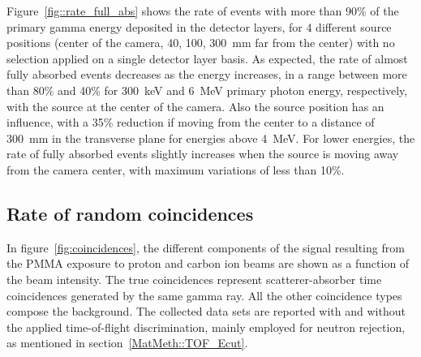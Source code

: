 Figure~\ref{fig::rate_full_abs} shows the rate of events with more than 90\% of the primary gamma energy deposited in the detector layers, for 4 different source positions (center of the camera, 40, 100, 300~mm far from the center) with no selection applied on a single detector layer basis. As expected, the rate of almost fully absorbed events decreases as the energy increases, in a range between more than 80\% and 40\% for 300~keV and 6~MeV primary photon energy, respectively, with the source at the center of the camera. Also the source position has an influence, with a 35\% reduction if moving from the center to a distance of 300~mm in the transverse plane for energies above 4~MeV. For lower energies, the rate of fully absorbed events slightly increases when the source is moving away from the camera center, with maximum variations of less than 10\%. 
 

\subsection{Rate of random coincidences}
\label{Results::beamInt}
 
In figure~\ref{fig:coincidences}, the different components of the signal resulting from the PMMA exposure to proton and carbon ion beams are shown as a function of the beam intensity. The true coincidences represent scatterer-absorber time coincidences generated by the same gamma ray. All the other coincidence types compose the background. The collected data sets are reported with and without the applied time-of-flight discrimination, mainly employed for neutron rejection, as mentioned in section~\ref{MatMeth::TOF_Ecut}.


